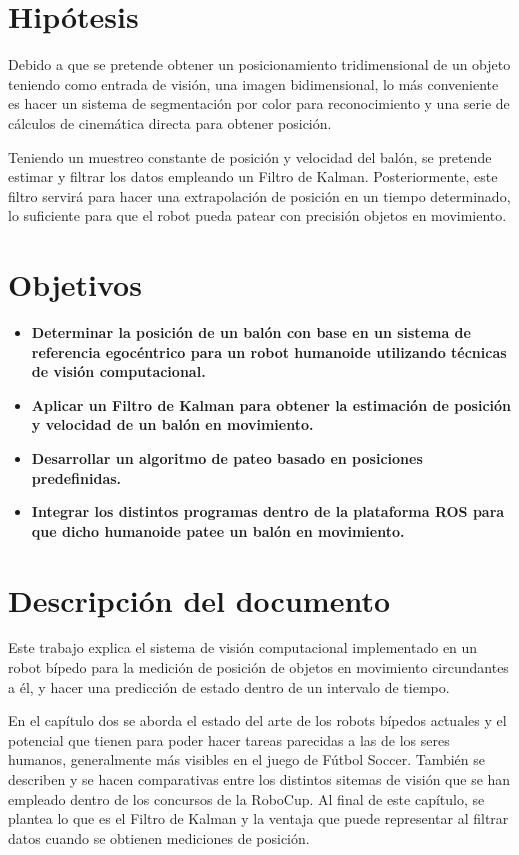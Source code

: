 	
\section{Hipótesis}
	Debido a que se pretende obtener un posicionamiento tridimensional de un objeto teniendo como entrada de visión, una imagen bidimensional, lo más conveniente es hacer un sistema de segmentación por color para reconocimiento y una serie de cálculos de cinemática directa para obtener posición.
	
	Teniendo un muestreo constante de posición y velocidad del balón, se pretende estimar y filtrar los datos empleando un Filtro de Kalman. Posteriormente, este filtro servirá para hacer una extrapolación de posición en un tiempo determinado, lo suficiente para que el robot pueda patear con precisión objetos en movimiento. 
	
	
\section{Objetivos}
		\begin{itemize}
			\item \textbf{Determinar la posición de un balón con base en un sistema de referencia egocéntrico para un robot humanoide utilizando técnicas de visión computacional.}
			
			\item \textbf{Aplicar un Filtro de Kalman para obtener la estimación de posición y velocidad de un balón en movimiento.}
			
			\item \textbf{Desarrollar un algoritmo de pateo basado en posiciones predefinidas.}
			
			\item \textbf{Integrar los distintos programas dentro de la plataforma ROS para que dicho humanoide patee un balón en movimiento.}
		\end{itemize}

\section{Descripción del documento}
	Este trabajo explica el sistema de visión computacional implementado en un robot bípedo para la medición de posición de objetos en movimiento circundantes a él, y hacer una predicción de estado dentro de un intervalo de tiempo.
	
	En el capítulo dos se aborda el estado del arte de los robots bípedos actuales y el potencial que tienen para poder hacer tareas parecidas a las de los seres humanos, generalmente más visibles en el juego de Fútbol Soccer. También se describen y se hacen comparativas entre los distintos sitemas de visión que se han empleado dentro de los concursos de la RoboCup. Al final de este capítulo, se plantea lo que es el Filtro de Kalman y la ventaja que puede representar al filtrar datos cuando se obtienen mediciones de posición.
	
